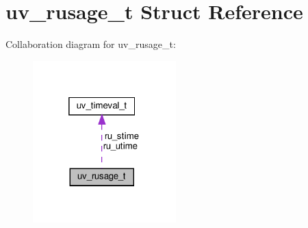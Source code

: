 \hypertarget{structuv__rusage__t}{}\section{uv\+\_\+rusage\+\_\+t Struct Reference}
\label{structuv__rusage__t}


Collaboration diagram for uv\+\_\+rusage\+\_\+t\+:
\nopagebreak
\begin{figure}[H]
\begin{center}
\leavevmode
\includegraphics[width=157pt]{structuv__rusage__t__coll__graph}
\end{center}
\end{figure}
